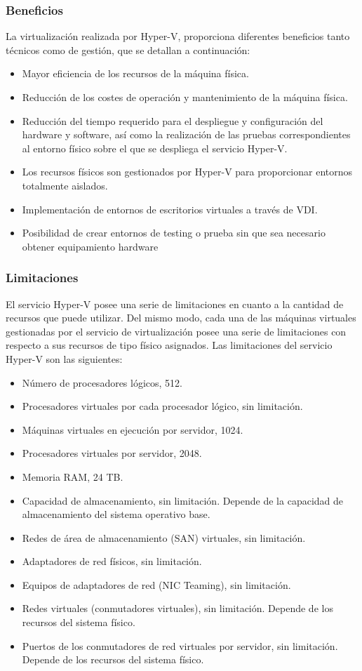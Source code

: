 \documentclass[preprint,12pt]{elsarticle}
\begin{document}
\subsubsection{\textbf{Beneficios}}
La virtualización realizada por Hyper-V, proporciona diferentes beneficios tanto técnicos como de gestión, que
se detallan a continuación:
\begin{itemize}
\item Mayor eficiencia de los recursos de la máquina física.
\item Reducción de los costes de operación y mantenimiento de la máquina física.
\item Reducción del tiempo requerido para el despliegue y configuración del hardware y software, así como la
realización de las pruebas correspondientes al entorno físico sobre el que se despliega el servicio Hyper-V.
\item Los recursos físicos son gestionados por Hyper-V para proporcionar entornos totalmente aislados.
\item Implementación de entornos de escritorios virtuales a través de VDI.
\item Posibilidad de crear entornos de testing o prueba sin que sea necesario obtener equipamiento hardware
\end{itemize}
\cite{Hyperv2019}

\subsubsection{\textbf{Limitaciones}}
El servicio Hyper-V posee una serie de limitaciones en cuanto a la cantidad de recursos que puede utilizar. Del
mismo modo, cada una de las máquinas virtuales gestionadas por el servicio de virtualización posee una serie de
limitaciones con respecto a sus recursos de tipo físico asignados.
Las limitaciones del servicio Hyper-V son las siguientes:
\begin{itemize}
\item Número de procesadores lógicos, 512.
\item Procesadores virtuales por cada procesador lógico, sin limitación.
\item Máquinas virtuales en ejecución por servidor, 1024.
\item Procesadores virtuales por servidor, 2048.
\item Memoria RAM, 24 TB.
\item Capacidad de almacenamiento, sin limitación. Depende de la capacidad de almacenamiento del sistema
operativo base.
\item Redes de área de almacenamiento (SAN) virtuales, sin limitación.
\item Adaptadores de red físicos, sin limitación.
\item Equipos de adaptadores de red (NIC Teaming), sin limitación.
\item Redes virtuales (conmutadores virtuales), sin limitación. Depende de los recursos del sistema físico.
\item Puertos de los conmutadores de red virtuales por servidor, sin limitación. Depende de los recursos del sistema físico.
\end{itemize}
\cite{Hyperv2019}
\end{document}
